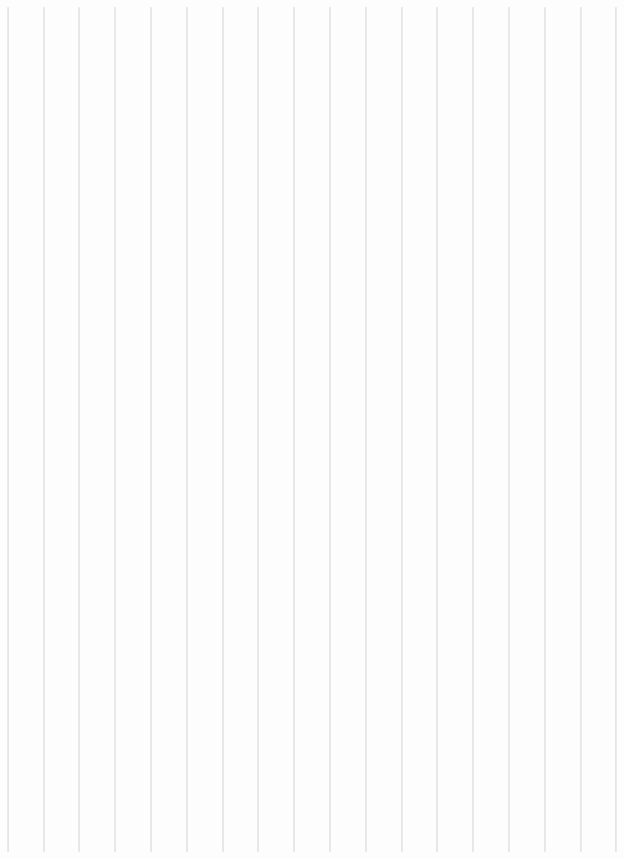 \documentclass[letterpaper,10pt,english]{sphinxmanual}
\begin{document}
\begin{quote}
\begin{quote}
\begin{quote}
\begin{quote}
\begin{quote}
\begin{quote}
\begin{quote}
\begin{quote}
\begin{quote}
\begin{quote}
\begin{quote}
\begin{quote}
\begin{quote}
\begin{quote}
\begin{quote}
\begin{quote}
\begin{quote}
\begin{quote}
\begin{quote}
\begin{quote}
\begin{quote}
\begin{quote}
\begin{quote}
\begin{quote}
\begin{quote}
\begin{quote}
\begin{quote}
\begin{quote}
\begin{quote}
\begin{quote}
\begin{quote}
\begin{quote}
\begin{quote}
\begin{quote}
\begin{quote}
\begin{quote}
\begin{quote}
\begin{quote}
\begin{quote}
\begin{quote}
\begin{quote}
\begin{quote}
\begin{quote}
\begin{quote}
\begin{quote}
\begin{quote}
\begin{quote}
\begin{quote}
\begin{quote}
\begin{quote}
\begin{quote}
\begin{quote}
\begin{quote}
\begin{quote}
\begin{quote}
\begin{quote}
\begin{quote}
\begin{quote}
\begin{quote}
\begin{quote}
\begin{quote}
\begin{quote}
\begin{quote}
\begin{quote}
\begin{quote}
\begin{quote}
\begin{quote}
\begin{quote}
\begin{quote}
\begin{quote}
\begin{quote}
\begin{quote}
\begin{quote}
\begin{quote}
\begin{quote}
\begin{quote}
\begin{quote}
\begin{quote}
\begin{quote}
\begin{quote}
\begin{quote}
\begin{quote}
\begin{quote}
\begin{quote}
\begin{quote}
\begin{quote}
\begin{quote}
\begin{quote}
\begin{quote}
\begin{quote}
\begin{quote}
\begin{quote}
\begin{quote}
\begin{savenotes}
\begin{longtable}[c]{|||}
\begin{savenotes}
\begin{longtable}[c]{|||||||}
\begin{savenotes}
\begin{longtable}[c]{|||}
\begin{quote}
\begin{description}
2e36d848b0/FinalDataAugust21.xlsm}
=======
\item[{Excel Direct Download:}] \leavevmode
\sphinxAtStartPar
\sphinxcode{\sphinxupquote{Current Excel Document}}

\item[{Excel Download Link:}] \leavevmode
\sphinxAtStartPar
\sphinxurl{https://github.com/justin-napolitano/turkish-kurdish-conflict/blob/main/FinalDataAugust21.xlsm}
>>>>>>> gh-pages

\end{description}\end{quote}


\section{Archived Data}
\label{\detokenize{data:archived-data}}

\subsection{2019}
\label{\detokenize{data:id1}}\begin{quote}
\begin{quote}\begin{description}
<<<<<<< HEAD
\item[{Excel Download Link:}] \leavevmode
\sphinxAtStartPar
{}
=======
\item[{Excel Direct Download:}] \leavevmode
\sphinxAtStartPar
\sphinxcode{\sphin
\end{description}
\end{quote}
\end{quote}
\end{longtable}
\end{savenotes}
\end{longtable}
\end{savenotes}
\end{longtable}
\end{savenotes}
\end{quote}
\end{quote}
\end{quote}
\end{quote}
\end{quote}
\end{quote}
\end{quote}
\end{quote}
\end{quote}
\end{quote}
\end{quote}
\end{quote}
\end{quote}
\end{quote}
\end{quote}
\end{quote}
\end{quote}
\end{quote}
\end{quote}
\end{quote}
\end{quote}
\end{quote}
\end{quote}
\end{quote}
\end{quote}
\end{quote}
\end{quote}
\end{quote}
\end{quote}
\end{quote}
\end{quote}
\end{quote}
\end{quote}
\end{quote}
\end{quote}
\end{quote}
\end{quote}
\end{quote}
\end{quote}
\end{quote}
\end{quote}
\end{quote}
\end{quote}
\end{quote}
\end{quote}
\end{quote}
\end{quote}
\end{quote}
\end{quote}
\end{quote}
\end{quote}
\end{quote}
\end{quote}
\end{quote}
\end{quote}
\end{quote}
\end{quote}
\end{quote}
\end{quote}
\end{quote}
\end{quote}
\end{quote}
\end{quote}
\end{quote}
\end{quote}
\end{quote}
\end{quote}
\end{quote}
\end{quote}
\end{quote}
\end{quote}
\end{quote}
\end{quote}
\end{quote}
\end{quote}
\end{quote}
\end{quote}
\end{quote}
\end{quote}
\end{quote}
\end{quote}
\end{quote}
\end{quote}
\end{quote}
\end{quote}
\end{quote}
\end{quote}
\end{quote}
\end{quote}
\end{quote}
\end{quote}
\end{quote}
\end{quote}
\end{document}
